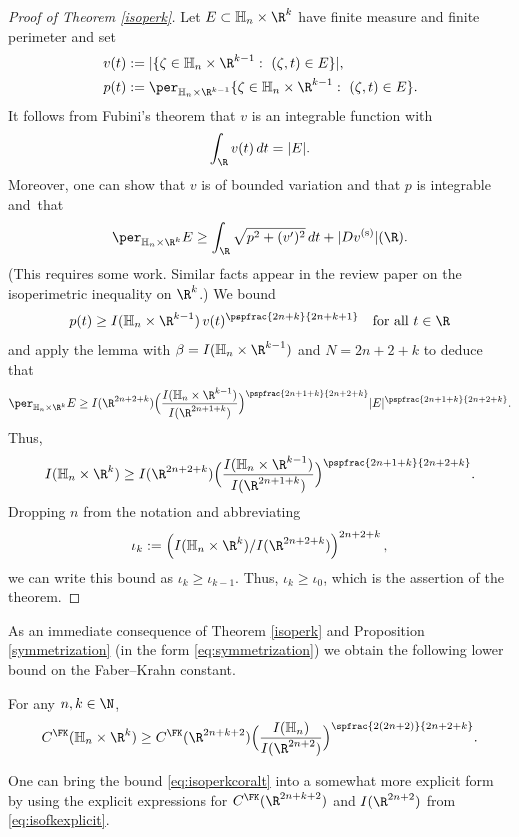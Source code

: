 \begin{proof}[Proof of Theorem \ref{isoperk}]
Let $E\subset\mathbb H_n\times\R^k$ have finite measure and finite perimeter and set
\begin{align*}
v(t) & := |\{ \zeta\in\mathbb H_n\times\R^{k-1} :\ (\zeta,t)\in E\}|, \\
p(t) & := \per_{\mathbb H_n\times\R^{k-1}} \{ \zeta\in\mathbb H_n\times\R^{k-1} :\ (\zeta,t)\in E\}.
\end{align*}
It follows from Fubini's theorem that $v$ is an integrable function with
\[
\int_\R v(t)\,dt = |E|.
\]
Moreover, one can show that $v$ is of bounded variation and that $p$ is integrable and~that
\[
\per_{\mathbb H_n\times\R^k} E \geq \int_\R \sqrt{ p^2 + (v')^2}\,dt + |Dv^{(\mathrm{s})}|(\R).
\]
(This requires some work. Similar facts appear in the review paper \cite{Ta} on the isoperimetric inequality on $\R^k$.) We bound
\[
p(t) \geq I(\mathbb H_n\times\R^{k-1})\,v(t)^\pspfrac{2n+k}{2n+k+1}
\quad\text{for all}\ t\in\R
\]
and apply the lemma with $\beta = I(\mathbb H_n\times\R^{k-1})$ and $N=2n+2+k$ to deduce that
\[
\per_{\mathbb H_n\times\R^k} E \geq
I(\R^{2n+2+k}) \Bigl(\frac{I(\mathbb H_n\times\R^{k-1})}{I(\R^{2n+1+k})}\Bigr)^\pspfrac{2n+1+k}{2n+2+k} |E|^\pspfrac{2n+1+k}{2n+2+k}.
\]
Thus,
\[
I(\mathbb H_n\times\R^k) \geq
I(\R^{2n+2+k}) \Bigl(\frac{I(\mathbb H_n\times\R^{k-1})}{I(\R^{2n+1+k})} \Bigr)^\pspfrac{2n+1+k}{2n+2+k}.
\]
Dropping $n$ from the notation and abbreviating
\[
\iota_k:= \left(I(\mathbb H_n\times\R^k)/I(\R^{2n+2+k})\right)^{2n+2+k},
\]
we can write this bound as $\iota_k\geq\iota_{k-1}$. Thus, $\iota_k\geq\iota_0$, which is the assertion of the theorem.
\end{proof}

As an immediate consequence of Theorem \ref{isoperk} and Proposition \ref{symmetrization} (in the form \eqref{eq:symmetrization}) we obtain the following lower bound on the Faber--Krahn constant.

\begin{corollary}\label{isoperkcor}
For any $n,k\in\N$,
\begin{equation}
\label{eq:isoperkcoralt}
C^\FK(\mathbb H_n\times\R^k) \geq C^\FK(\R^{2n+k+2}) \Bigl(\frac{I(\mathbb H_n)}{I(\R^{2n+2})} \Bigr)^\spfrac{2(2n+2)}{2n+2+k}.
\end{equation}
\end{corollary}

One can bring the bound \eqref{eq:isoperkcoralt} into a somewhat more explicit form by using the explicit expressions for $C^\FK(\R^{2n+k+2})$ and $I(\R^{2n+2})$ from \eqref{eq:isofkexplicit}.

